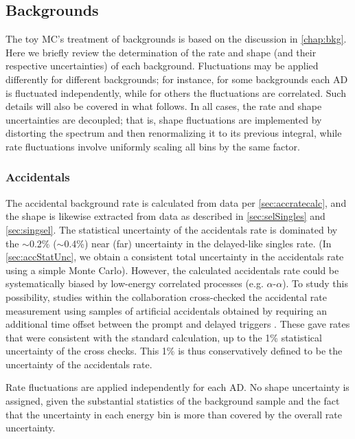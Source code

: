 \documentclass[../thesis.tex]{subfiles}
\begin{document}
\subsection{Backgrounds}
\label{sec:fitToyBackgrounds}

The toy MC's treatment of backgrounds is based on the discussion in \autoref{chap:bkg}. Here we briefly review the determination of the rate and shape (and their respective uncertainties) of each background. Fluctuations may be applied differently for different backgrounds; for instance, for some backgrounds each AD is fluctuated independently, while for others the fluctuations are correlated. Such details will also be covered in what follows. In all cases, the rate and shape uncertainties are decoupled; that is, shape fluctuations are implemented by distorting the spectrum and then renormalizing it to its previous integral, while rate fluctuations involve uniformly scaling all bins by the same factor.

\subsubsection{Accidentals}

The accidental background rate is calculated from data per \autoref{sec:accratecalc}, and the shape is likewise extracted from data as described in \autoref{sec:selSingles} and \autoref{sec:singsel}. The statistical uncertainty of the accidentals rate is dominated by the $\sim$0.2\% ($\sim$0.4\%) near (far) uncertainty in the delayed-like singles rate. (In \autoref{sec:accStatUnc}, we obtain a consistent total uncertainty in the accidentals rate using a simple Monte Carlo). However, the calculated accidentals rate could be systematically biased by low-energy correlated processes (e.g. $\alpha$-$\alpha$). To study this possibility, studies within the collaboration cross-checked the accidental rate measurement using samples of artificial accidentals obtained by requiring an additional time offset between the prompt and delayed triggers \cite{An_2017}. These gave rates that were consistent with the standard calculation, up to the 1\% statistical uncertainty of the cross checks. This 1\% is thus conservatively defined to be the uncertainty of the accidentals rate.

Rate fluctuations are applied independently for each AD. No shape uncertainty is assigned, given the substantial statistics of the background sample and the fact that the uncertainty in each energy bin is more than covered by the overall rate uncertainty.
\end{document}
